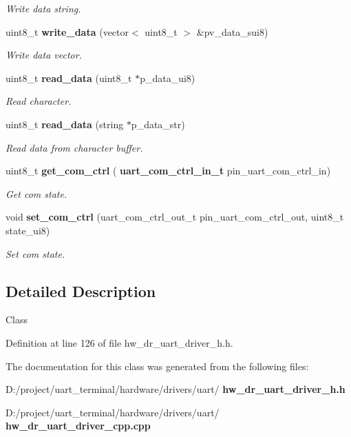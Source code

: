 \begin{DoxyCompactItemize}
\begin{DoxyCompactList}\small\item\em Write data string. \end{DoxyCompactList}\item 
uint8\+\_\+t \textbf{ write\+\_\+data} (vector$<$ uint8\+\_\+t $>$ \&pv\+\_\+data\+\_\+sui8)
\begin{DoxyCompactList}\small\item\em Write data vector. \end{DoxyCompactList}\item 
uint8\+\_\+t \textbf{ read\+\_\+data} (uint8\+\_\+t $\ast$p\+\_\+data\+\_\+ui8)
\begin{DoxyCompactList}\small\item\em Read character. \end{DoxyCompactList}\item 
uint8\+\_\+t \textbf{ read\+\_\+data} (string $\ast$p\+\_\+data\+\_\+str)
\begin{DoxyCompactList}\small\item\em Read data from character buffer. \end{DoxyCompactList}\item 
uint8\+\_\+t \textbf{ get\+\_\+com\+\_\+ctrl} (\textbf{ uart\+\_\+com\+\_\+ctrl\+\_\+in\+\_\+t} pin\+\_\+uart\+\_\+com\+\_\+ctrl\+\_\+in)
\begin{DoxyCompactList}\small\item\em Get com state. \end{DoxyCompactList}\item 
void \textbf{ set\+\_\+com\+\_\+ctrl} (uart\+\_\+com\+\_\+ctrl\+\_\+out\+\_\+t pin\+\_\+uart\+\_\+com\+\_\+ctrl\+\_\+out, uint8\+\_\+t state\+\_\+ui8)
\begin{DoxyCompactList}\small\item\em Set com state. \end{DoxyCompactList}\end{DoxyCompactItemize}


\subsection{Detailed Description}
Class 

Definition at line 126 of file hw\+\_\+dr\+\_\+uart\+\_\+driver\+\_\+h.\+h.



The documentation for this class was generated from the following files\+:\begin{DoxyCompactItemize}
\item 
D\+:/project/uart\+\_\+terminal/hardware/drivers/uart/\textbf{ hw\+\_\+dr\+\_\+uart\+\_\+driver\+\_\+h.\+h}\item 
D\+:/project/uart\+\_\+terminal/hardware/drivers/uart/\textbf{ hw\+\_\+dr\+\_\+uart\+\_\+driver\+\_\+cpp.\+cpp}\end{DoxyCompactItemize}
